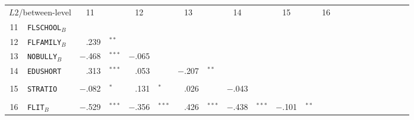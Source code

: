 {\begin{tabular}{cl r@{\hskip -0.1mm}l r@{\hskip -0.1mm}l r@{\hskip -0.1mm}l r@{\hskip -0.1mm}l r@{\hskip -0.1mm}l r@{\hskip -0.1mm}l r@{\hskip -0.1mm}l r@{\hskip -0.1mm}l r@{\hskip -0.1mm}l r@{\hskip -0.1mm}l}
        \cmidrule[0.08em]{1-14}    \multicolumn{2}{c}{$L2$/between-level} & \multicolumn{1}{c}{11} &       & \multicolumn{1}{c}{12} &       & \multicolumn{1}{c}{13} &       & \multicolumn{1}{c}{14} &       & \multicolumn{1}{c}{15} &       & \multicolumn{1}{c}{16} &       &       &       &       &       &       &       &       &  \\
        \cmidrule[0.06em]{1-14}    11    & \texttt{FLSCHOOL}$_B$ &       &       &       &       &       &       &       &       &       &       &       &       &       &       &       &       &       &       &       &  \\
            12    & \texttt{FLFAMILY}$_B$ & \cellcolor[rgb]{ .765,  .765,  1}.239 & $^{**}$ &       &       &       &       &       &       &       &       &       &       &       &       &       &       &       &       &       &  \\
            13    & \texttt{NOBULLY}$_B$ & \cellcolor[rgb]{ 1,  .529,  .529}$-.$468 & $^{***}$ & \cellcolor[rgb]{ 1,  .933,  .933}$-.$065 &       &       &       &       &       &       &       &       &       &       &       &       &       &       &       &       &  \\
            14    & \texttt{EDUSHORT} & \cellcolor[rgb]{ .69,  .69,  1}.313 & $^{***}$ & \cellcolor[rgb]{ .949,  .949,  1}.053 &       & \cellcolor[rgb]{ 1,  .792,  .792}$-.$207 & $^{**}$ &       &       &       &       &       &       &       &       &       &       &       &       &       &  \\
                  &       &       &       &       &       &       &       &       &       &       &       &       &       &       &       &       &       &       &       &       &  \\
            15    & \texttt{STRATIO} & \cellcolor[rgb]{ 1,  .918,  .918}$-.$082 & $^*$ & \cellcolor[rgb]{ .871,  .871,  1}.131 & $^*$ & \cellcolor[rgb]{ .976,  .976,  1}.026 &       & \cellcolor[rgb]{ 1,  .957,  .957}$-.$043 &       &       &       &       &       &       &       &       &       &       &       &       &  \\
                  &       &       &       &       &       &       &       &       &       &       &       &       &       &       &       &       &       &       &       &       &  \\
            16    & \texttt{FLIT}$_B$  & \cellcolor[rgb]{ 1,  .471,  .471}$-.$529 & $^{***}$ & \cellcolor[rgb]{ 1,  .643,  .643}$-.$356 & $^{***}$ & \cellcolor[rgb]{ .576,  .576,  1}.426 & $^{***}$ & \cellcolor[rgb]{ 1,  .561,  .561}$-.$438 & $^{***}$ & \cellcolor[rgb]{ 1,  .898,  .898}$-.$101 & $^{**}$ &       &       &       &       &       &       &       &       &       &  \\

\end{tabular}}
